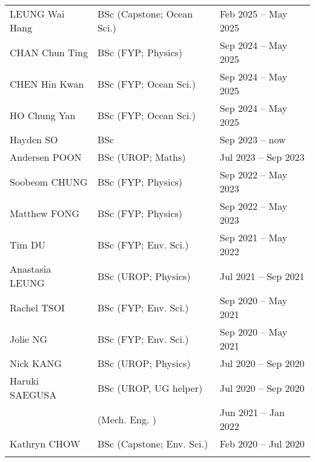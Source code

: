 \documentclass[letterpaper]{article}
\begin{document}
\begin{tabularx}{\textwidth}{XXX}
  LEUNG Wai Hang          & BSc (Capstone; Ocean Sci.) & Feb 2025 -- May 2025\\
  CHAN Chun Ting          & BSc (FYP; Physics)    & Sep 2024 -- May 2025\\
  CHEN Hin Kwan           & BSc (FYP; Ocean Sci.) & Sep 2024 -- May 2025\\
  HO Chung Yan            & BSc (FYP; Ocean Sci.) & Sep 2024 -- May 2025\\
  Hayden SO               & BSc                   & Sep 2023 -- now\\
  Andersen POON           & BSc (UROP; Maths)     & Jul 2023 -- Sep 2023\\
  Soobeom CHUNG           & BSc (FYP; Physics)    & Sep 2022 -- May 2023\\
  Matthew FONG            & BSc (FYP; Physics)    & Sep 2022 -- May 2023\\
  Tim DU                  & BSc (FYP; Env. Sci.)  & Sep 2021 -- May 2022\\
  Anastasia LEUNG         & BSc (UROP; Physics)   & Jul 2021 -- Sep 2021\\
  Rachel TSOI             & BSc (FYP; Env. Sci.)  & Sep 2020 -- May 2021\\
  Jolie NG                & BSc (FYP; Env. Sci.)  & Sep 2020 -- May 2021\\
  Nick KANG               & BSc (UROP; Physics)   & Jul 2020 -- Sep 2020\\
  Haruki SAEGUSA          & BSc (UROP, UG helper) & Jul 2020 -- Sep 2020\\
                          &     (Mech. Eng.     ) & Jun 2021 -- Jan 2022\\
  Kathryn CHOW            & BSc (Capstone; Env. Sci.)  & Feb 2020 -- Jul 2020\\
  \\
\end{tabularx}

\end{document}
